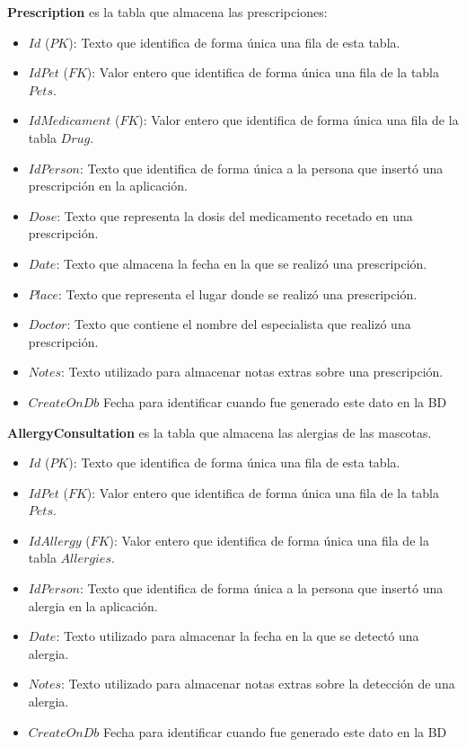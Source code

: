 \textbf{Prescription} es la tabla que almacena las prescripciones:

\begin{itemize}
	\item	$Id$ ($PK$): Texto que identifica de forma única una fila de esta tabla.
	\item	$IdPet$ ($FK$): Valor entero que identifica de forma única una fila de la tabla $Pets$.
	\item	$IdMedicament$ ($FK$): Valor entero que identifica de forma única una fila de la tabla $Drug$.
	\item	$IdPerson$: Texto que identifica de forma única a la persona que insertó una prescripción en la aplicación.
	\item	$Dose$: Texto que representa la dosis del medicamento recetado en una prescripción.
	\item	$Date$: Texto que almacena la fecha en la que se realizó una prescripción.
	\item	$Place$: Texto que representa el lugar donde se realizó una prescripción.
	\item	$Doctor$: Texto que contiene el nombre del especialista que realizó una prescripción.
	\item	$Notes$: Texto utilizado para almacenar notas extras sobre una prescripción.
		\item	$CreateOnDb$ 
	Fecha para identificar cuando fue generado este dato en la BD
	
\end{itemize}

\textbf{AllergyConsultation} es la tabla que almacena las alergias de las mascotas.
\begin{itemize}
	
	
	\item	$Id$ ($PK$): Texto que identifica de forma única una fila de esta tabla.
	\item	$IdPet$ ($FK$): Valor entero que identifica de forma única una fila de la tabla $Pets$.
	\item	$IdAllergy$ ($FK$): Valor entero que identifica de forma única una fila de la tabla $Allergies$.
	\item	$IdPerson$: Texto que identifica de forma única a la persona que insertó una alergia en la aplicación.
	\item	$Date$: Texto utilizado para almacenar la fecha en la que se detectó una alergia.
	\item	$Notes$: Texto utilizado para almacenar notas extras sobre la detección de una alergia.
	\item	$CreateOnDb$ 
Fecha para identificar cuando fue generado este dato en la BD
\end{itemize}


